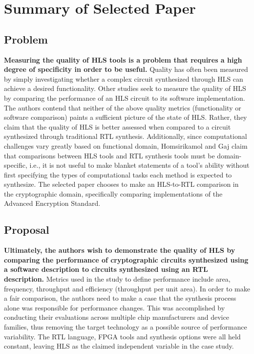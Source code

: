 \documentclass[12pt,journal,compsoc,onecolumn]{IEEEtran}
\begin{document}
\section{Summary of Selected Paper}
\subsection{Problem}

\textbf{Measuring the quality of HLS tools is a problem that requires a high degree of specificity in order to be useful.} Quality has often been measured by simply investigating whether a complex circuit synthesized through HLS can achieve a desired functionality\cite{8}\cite{9}\cite{10}\cite{11}\cite{12}. Other studies \cite{3}\cite{4} seek to measure the quality of HLS by comparing the performance of an HLS circuit to its software implementation. The authors contend that neither of the above quality metrics (functionality or software comparison) paints a sufficient picture of the state of HLS. Rather, they claim that the quality of HLS is better assessed when compared to a circuit synthesized through traditional RTL synthesis. Additionally, since computational challenges vary greatly based on functional domain, Homsirikamol and Gaj claim that comparisons between HLS tools and RTL synthesis tools must be domain-specific, i.e., it is not useful to make blanket statements of a tool's ability without first specifying the types of computational tasks each method is expected to synthesize. The selected paper chooses to make an HLS-to-RTL comparison in the cryptographic domain, specifically comparing implementations of the Advanced Encryption Standard.

\subsection{Proposal}

\textbf{Ultimately, the authors wish to demonstrate the quality of HLS by comparing the performance of cryptographic circuits synthesized using a software description to circuits synthesized using an RTL description.} Metrics used in the study to define performance include area, frequency, throughput and efficiency (throughput per unit area). In order to make a fair comparison, the authors need to make a case that the synthesis process alone was responsible for performance changes. This was accomplished by conducting their evaluations across multiple chip manufacturers and device families, thus removing the target technology as a possible source of performance variability. The RTL language, FPGA tools and synthesis options were all held constant, leaving HLS as the claimed independent variable in the case study. 
\end{document}
